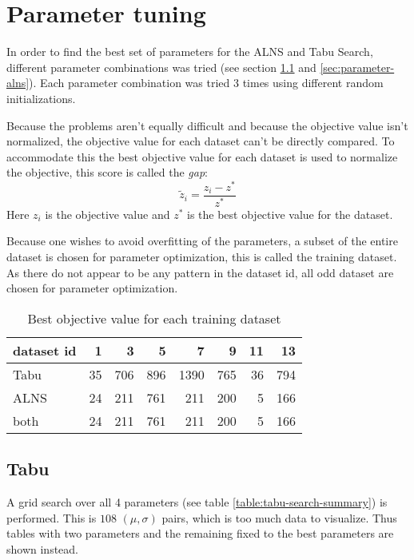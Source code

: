 \section{Parameter tuning}
\label{sec:parameter-tuning}

In order to find the best set of parameters for the ALNS and Tabu Search, different parameter combinations was tried (see section \ref{sec:parameter-tabu} and \ref{sec:parameter-alns}). Each parameter combination was tried 3 times using different random initializations.

Because the problems aren't equally difficult and because the objective value isn't normalized, the objective value for each dataset can't be directly compared. To accommodate this the best objective value for each dataset is used to normalize the objective, this score is called the \textit{gap}:
\begin{equation}
\tilde{z}_i = \frac{z_i - z^*}{z^*}
\end{equation}
Here $z_i$ is the objective value and $z^*$ is the best objective value for the dataset.

Because one wishes to avoid overfitting of the parameters, a subset of the entire dataset is chosen for parameter optimization, this is called the training dataset. As there do not appear to be any pattern in the dataset id, all odd dataset are chosen for parameter optimization.

\begin{table}[H]
\centering
\begin{tabular}{l|rrrrrrr}
 dataset id &   1 &   3 &   5 &    7 &   9 &   11 &   13 \\
\hline
 Tabu   &  35 & 706 & 896 & 1390 & 765 &   36 &  794 \\
 ALNS   &  24 & 211 & 761 &  211 & 200 &    5 &  166 \\
 both   &  24 & 211 & 761 &  211 & 200 &    5 &  166 \\
\end{tabular}
\caption{Best objective value for each training dataset}
\end{table}

\subsection{Tabu}
\label{sec:parameter-tabu}

A grid search over all 4 parameters (see table \ref{table:tabu-search-summary}) is performed. This is $108$ $(\mu, \sigma)$ pairs, which is too much data to visualize. Thus tables with two parameters and the remaining fixed to the best parameters are shown instead.

